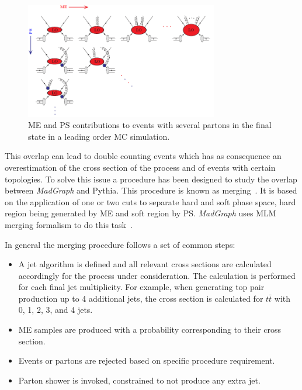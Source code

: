 \begin{figure}[!Hhtbp]
  \begin{center}
    \includegraphics[width=0.75\textwidth]{figs/PSMEInterface.png}
    \caption{ME and PS contributions to events with several partons in the final state in a leading order MC simulation.}
    \label{fig:PSME}
  \end{center}
\end{figure}

This overlap can lead to double counting events which has as consequence an overestimation of the cross section of the process and of events with certain topologies. To solve this issue a procedure has been designed to study the overlap between \textit{MadGraph} and Pythia. This procedure is known as merging~\cite{Alwall:2007fs, Alwall:2008qv, Lavesson:2007uu}. It is based on the application of one or two cuts to separate hard and soft phase space, hard region being generated by ME and soft region by PS. \textit{MadGraph} uses MLM merging formalism to do this task~\cite{Mangano:2001xp, Mangano:2006rw}. 

In general the merging procedure follows a set of common steps:
\begin{itemize}
\item A jet algorithm is defined and all relevant cross sections are calculated accordingly for the process under consideration. The calculation is performed for each final jet multiplicity. For example, when generating top pair production up to 4 additional jets, the cross section is calculated for $t\bar{t}$ with 0, 1, 2, 3, and 4 jets. 
\item ME samples are produced with a probability corresponding to their cross section.
\item Events or partons are rejected based on specific procedure requirement.
\item Parton shower is invoked, constrained to not produce any extra jet.
\end{itemize}

